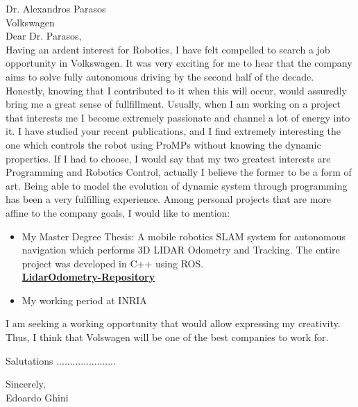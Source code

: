 \begin{FlushLeft}
Dr. Alexandros Parasos \\
Volkswagen\\

\vspace{2cm}
Dear Dr. Parasos,\\

Having an ardent interest for Robotics, I have felt compelled to search a job opportunity in Volkswagen.
It was very exciting for me to hear that the company aims to solve fully autonomous driving by the second half of the decade.
Honestly, knowing that I contributed to it when this will occur, would assuredly bring me a great sense of fullfillment.
Usually, when I am working on a project that interests me I become extremely passionate and channel a lot of energy into it.
I have studied your recent publications, and I find  extremely interesting the one which controls the robot using ProMPs without knowing the dynamic properties.
If I had to choose, I would say that my two greatest interests are Programming and Robotics Control, actually I believe the former to be a form of art.
Being able to model the evolution of dynamic system through programming has been a very fulfilling experience.
Among personal projects that are more affine to the company goals, I would like to mention:
\begin{itemize}
\item My Master Degree Thesis:  A mobile robotics SLAM system for autonomous navigation which performs 3D LIDAR Odometry and Tracking.
The entire project was developed in C++ using ROS.\\
\href{https://github.com/dinies/3D-Lidar-Odometry-and-Tracking}{\textbf{LidarOdometry-Repository}}\\
\item My working period at INRIA
\end{itemize}
I am seeking a working opportunity that would allow expressing my creativity.
Thus, I think that Volswagen will be one of the best companies to work for.


Salutations ......................

\bigskip
Sincerely,\\
Edoardo Ghini
\end{FlushLeft}

